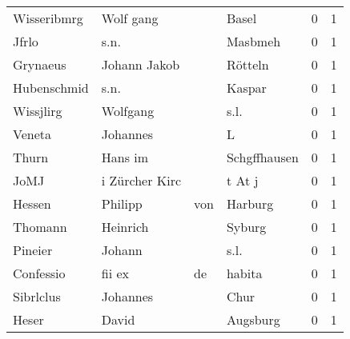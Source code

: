 \begin{tabular}{llllrr}
              Wisseribmrg &                          Wolf gang &             &                                       Basel &          0 &         1 \\
                    Jfrlo &                               s.n. &             &                                     Masbmeh &          0 &         1 \\
                 Grynaeus &                       Johann Jakob &             &                                     Rötteln &          0 &         1 \\
              Hubenschmid &                               s.n. &             &                                      Kaspar &          0 &         1 \\
                Wissjlirg &                           Wolfgang &             &                                        s.l. &          0 &         1 \\
                   Veneta &                           Johannes &             &                                           L &          0 &         1 \\
                    Thurn &                            Hans im &             &                                Schgffhausen &          0 &         1 \\
                     JoMJ &                     i Zürcher Kirc &             &                                      t At j &          0 &         1 \\
                   Hessen &                            Philipp &         von &                                     Harburg &          0 &         1 \\
                  Thomann &                           Heinrich &             &                                      Syburg &          0 &         1 \\
                  Pineier &                             Johann &             &                                        s.l. &          0 &         1 \\
                Confessio &                             fii ex &          de &                                      habita &          0 &         1 \\
                Sibrlclus &                           Johannes &             &                                        Chur &          0 &         1 \\
                    Heser &                              David &             &                                    Augsburg &          0 &         1 \\

\end{tabular}
